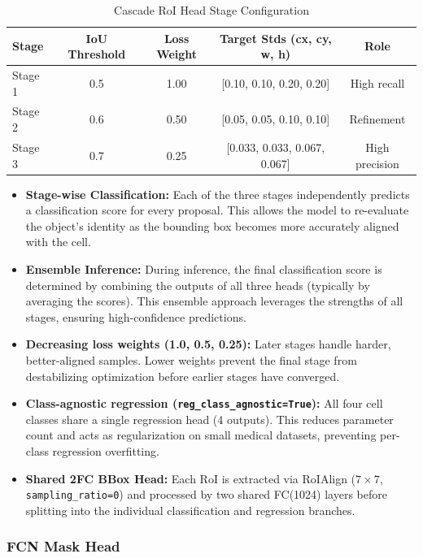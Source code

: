 \documentclass[a4paper]{article} %
\begin{document}
\begin{table}[H]
\centering
\caption{Cascade RoI Head Stage Configuration}
\label{tab:cascade_stages}
\begin{tabular}{lcccc}
\toprule
\textbf{Stage} & \textbf{IoU Threshold} & \textbf{Loss Weight} & \textbf{Target Stds (cx, cy, w, h)} & \textbf{Role} \\
\midrule
Stage 1 & 0.5 & 1.00 & [0.10, 0.10, 0.20, 0.20] & High recall  \\
Stage 2 & 0.6 & 0.50 & [0.05, 0.05, 0.10, 0.10] & Refinement   \\
Stage 3 & 0.7 & 0.25 & [0.033, 0.033, 0.067, 0.067] & High precision \\
\bottomrule
\end{tabular}
\end{table}

\begin{itemize}
    \item \textbf{Stage-wise Classification:} Each of the three stages independently predicts a classification score for every proposal. This allows the model to re-evaluate the object's identity as the bounding box becomes more accurately aligned with the cell.
    \item \textbf{Ensemble Inference:} During inference, the final classification score is determined by combining the outputs of all three heads (typically by averaging the scores). This ensemble approach leverages the strengths of all stages, ensuring high-confidence predictions.
    \item \textbf{Decreasing loss weights (1.0, 0.5, 0.25):} Later stages handle harder, better-aligned samples. Lower weights prevent the final stage from destabilizing optimization before earlier stages have converged.
    \item \textbf{Class-agnostic regression (\texttt{reg\_class\_agnostic=True}):} All four cell classes share a single regression head (4 outputs). This reduces parameter count and acts as regularization on small medical datasets, preventing per-class regression overfitting.
    \item \textbf{Shared 2FC BBox Head:} Each RoI is extracted via RoIAlign ($7\times7$, \texttt{sampling\_ratio=0}) and processed by two shared FC(1024) layers before splitting into the individual classification and regression branches.
\end{itemize}

\subsubsection{FCN Mask Head}
\end{document}
